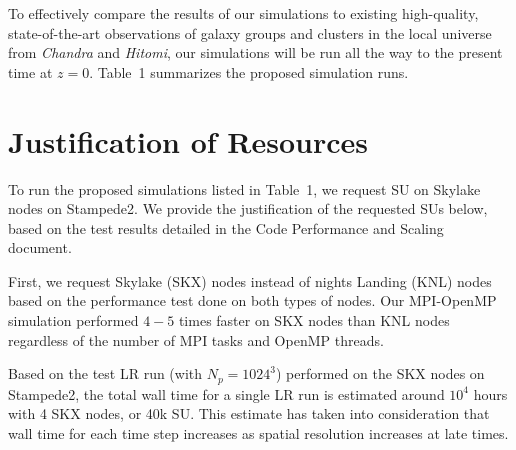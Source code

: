 \documentclass[letterpaper,11pt]{article}
\begin{document}
To effectively compare the results of our simulations to existing high-quality, state-of-the-art observations of galaxy groups and clusters in the local universe from {\em Chandra} and {\em Hitomi}, our simulations will be run all the way to the present time at $z=0$. Table~1 summarizes the proposed simulation runs. 

\section{Justification of Resources}

To run the proposed simulations listed in Table~1, we request SU on Skylake nodes on Stampede2. We provide the justification of the requested SUs below, based on the test results detailed in the Code Performance and Scaling document. 

First, we request Skylake (SKX) nodes instead of nights Landing (KNL) nodes based on the performance test done on both types of nodes. Our MPI-OpenMP simulation performed $4-5$ times faster on SKX nodes than KNL nodes regardless of the number of MPI tasks and OpenMP threads.

Based on the test LR run (with $N_p = 1024^3$) performed on the SKX nodes on Stampede2, the total wall time for a single LR run is estimated around $10^4$ hours with 4 SKX nodes, or 40k SU. This estimate has taken into consideration that wall time for each time step increases as spatial resolution increases at late times. 
\end{document}

